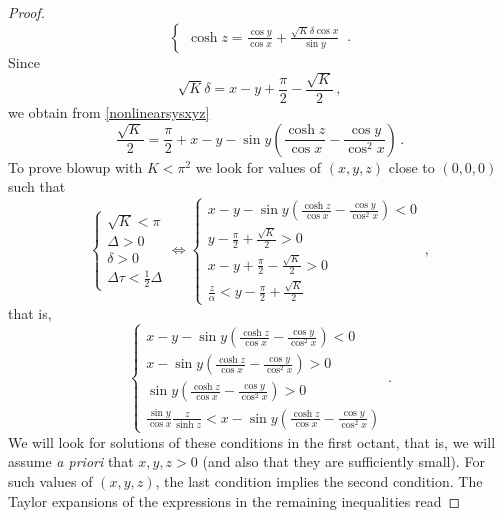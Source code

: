 \documentclass[10pt]{amsart}
\begin{document}
\begin{proof}
\begin{equation}
\begin{cases}
\cosh z = \frac{\cos y}{\cos x} + \frac{\sqrt{K} \delta\cos x}{\sin y}
\end{cases} \, .
\end{equation}
Since
\begin{equation}
\sqrt{K} \delta = x - y + \frac{\pi}2 - \frac{\sqrt{K}}2 \, ,
\end{equation}
we obtain from \eqref{nonlinearsysxyz}
\begin{equation}
\frac{\sqrt{K}}2 = \frac{\pi}2 + x - y - \sin y \left( \frac{\cosh z}{\cos x} - \frac{\cos y}{\cos^2 x} \right) \, .
\end{equation}
To prove blowup with $K<\pi^2$ we look for values of $(x,y,z)$ close to $(0,0,0)$ such that
\begin{equation}
\begin{cases}
\sqrt{K} < \pi \\
\Delta > 0 \\
\delta > 0 \\
\Delta \tau < \frac12 \Delta
\end{cases} 
\Leftrightarrow
\begin{cases}
x - y - \sin y \left( \frac{\cosh z}{\cos x} - \frac{\cos y}{\cos^2 x} \right) < 0 \\
y - \frac{\pi}2 + \frac{\sqrt{K}}2 > 0 \\
x - y + \frac{\pi}2 - \frac{\sqrt{K}}2 > 0 \\
\frac{z}{\alpha} < y - \frac{\pi}2 + \frac{\sqrt{K}}2
\end{cases} 
\, ,
\end{equation}
that is,
\begin{equation} \label{ineqs}
\begin{cases}
x - y - \sin y \left( \frac{\cosh z}{\cos x} - \frac{\cos y}{\cos^2 x} \right) < 0 \\
x - \sin y \left( \frac{\cosh z}{\cos x} - \frac{\cos y}{\cos^2 x} \right) > 0 \\
\sin y \left( \frac{\cosh z}{\cos x} - \frac{\cos y}{\cos^2 x} \right) > 0 \\
\frac{\sin y}{\cos x}\frac{z}{\sinh z} < x - \sin y \left( \frac{\cosh z}{\cos x} - \frac{\cos y}{\cos^2 x} \right)
\end{cases} 
\, .
\end{equation}
We will look for solutions of these conditions in the first octant, that is, we will assume {\em a priori} that $x,y,z >0$ (and also that they are sufficiently small). For such values of $(x,y,z)$, the last condition implies the second condition. The Taylor expansions of the expressions in the remaining inequalities read

\end{proof}
\end{document}
